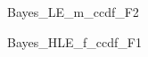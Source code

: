 \documentclass[a4j,11pt,mc, twocolumn]{jreport}
\begin{document}
	\begin{figure}[h!]
		\begin{center}
				\caption{Bayes\_LE\_m\_ccdf\_F2}
		\end{center}
	\end{figure}




	\begin{figure}[h!]
		\begin{center}
				\caption{Bayes\_HLE\_f\_ccdf\_F1}
		\end{center}
	\end{figure}
\end{document}

